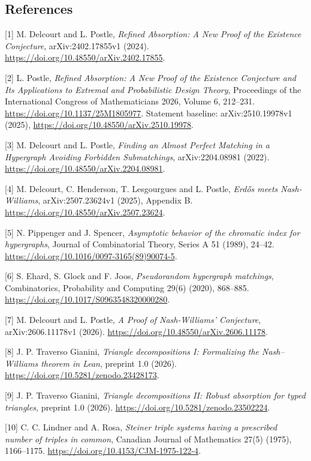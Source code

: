 \documentclass[english,11pt,a4paper]{article}
\begin{document}
\subsection{References}\label{references}

\begingroup\small\raggedright
\setlength{\parskip}{3pt}

{[}1{]} M. Delcourt and L. Postle, \emph{Refined Absorption: A New Proof of the Existence Conjecture}, arXiv:2402.17855v1 (2024). \url{https://doi.org/10.48550/arXiv.2402.17855}.

{[}2{]} L. Postle, \emph{Refined Absorption: A New Proof of the Existence Conjecture and Its Applications to Extremal and Probabilistic Design Theory}, Proceedings of the International Congress of Mathematicians 2026, Volume 6, 212--231. \url{https://doi.org/10.1137/25M1805977}. Statement baseline: arXiv:2510.19978v1 (2025), \url{https://doi.org/10.48550/arXiv.2510.19978}.

{[}3{]} M. Delcourt and L. Postle, \emph{Finding an Almost Perfect Matching in a Hypergraph Avoiding Forbidden Submatchings}, arXiv:2204.08981 (2022). \url{https://doi.org/10.48550/arXiv.2204.08981}.

{[}4{]} M. Delcourt, C. Henderson, T. Lesgourgues and L. Postle, \emph{Erdős meets Nash-Williams}, arXiv:2507.23624v1 (2025), Appendix B. \url{https://doi.org/10.48550/arXiv.2507.23624}.

{[}5{]} N. Pippenger and J. Spencer, \emph{Asymptotic behavior of the chromatic index for hypergraphs}, Journal of Combinatorial Theory, Series A 51 (1989), 24--42. \url{https://doi.org/10.1016/0097-3165(89)90074-5}.

{[}6{]} S. Ehard, S. Glock and F. Joos, \emph{Pseudorandom hypergraph matchings}, Combinatorics, Probability and Computing 29(6) (2020), 868--885. \url{https://doi.org/10.1017/S0963548320000280}.

{[}7{]} M. Delcourt and L. Postle, \emph{A Proof of Nash-Williams' Conjecture}, arXiv:2606.11178v1 (2026). \url{https://doi.org/10.48550/arXiv.2606.11178}.

{[}8{]} J. P. Traverso Gianini, \emph{Triangle decompositions I: Formalizing the Nash--Williams theorem in Lean}, preprint 1.0 (2026). \url{https://doi.org/10.5281/zenodo.23428173}.

{[}9{]} J. P. Traverso Gianini, \emph{Triangle decompositions II: Robust absorption for typed triangles}, preprint 1.0 (2026). \url{https://doi.org/10.5281/zenodo.23502224}.

{[}10{]} C. C. Lindner and A. Rosa, \emph{Steiner triple systems having a prescribed number of triples in common}, Canadian Journal of Mathematics 27(5) (1975), 1166--1175. \url{https://doi.org/10.4153/CJM-1975-122-4}.
\end{document}
